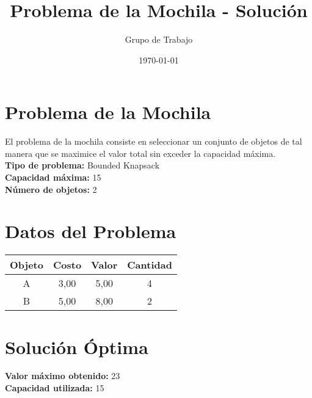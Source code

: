 \documentclass{article}
\title{Problema de la Mochila - Solución}
\author{Grupo de Trabajo}
\date{\today}
\begin{document}
\maketitle

\section*{Problema de la Mochila}
El problema de la mochila consiste en seleccionar un conjunto de objetos de tal manera que se maximice el valor total sin exceder la capacidad máxima.\\

\textbf{Tipo de problema:} Bounded Knapsack\\
\textbf{Capacidad máxima:} 15\\
\textbf{Número de objetos:} 2\\

\section*{Datos del Problema}
\begin{tabular}{|c|c|c|c|}
\hline
Objeto & Costo & Valor & Cantidad \\
\hline
A & 3,00 & 5,00 & 4 \\
B & 5,00 & 8,00 & 2 \\
\hline
\end{tabular}

\section*{Solución Óptima}
\textbf{Valor máximo obtenido:} 23\\
\textbf{Capacidad utilizada:} 15\\
\end{document}
